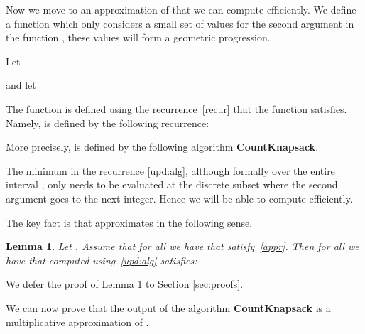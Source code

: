 \documentclass[11pt]{article}
\newtheorem{lemma}{Lemma}[section]
\begin{document}
Now we move to an approximation of  that we can compute efficiently.
We define a function  which only considers a small set of values 
for the second argument in the function , these values will form a
geometric progression.

Let

and let

The function  is defined
using the recurrence~\eqref{recur} that the function  satisfies.
Namely,  is defined by the following recurrence:


More precisely,  is defined by the following algorithm {\bf CountKnapsack}.

\begin{center}
\end{center}


The minimum in the recurrence \eqref{upd:alg}, although formally over the entire interval , only needs to be evaluated at the discrete subset where the second argument goes to the next integer.  Hence we will be able to compute  efficiently.

The key fact is that  approximates  in the following sense.

\begin{lemma}
\label{lem:approx}
Let . Assume that for all  we have that  satisfy~\eqref{appr}.
Then for all  we have that  computed using~\eqref{upd:alg}
satisfies:

\end{lemma}

We defer the proof of Lemma \ref{lem:approx} to Section \ref{sec:proofs}.

We can now prove that the output  of the
algorithm {\bf CountKnapsack} is a
 multiplicative
approximation of .
\end{document}
